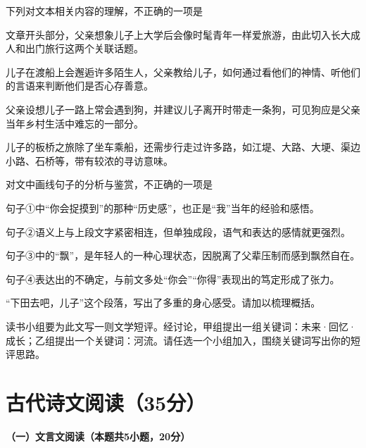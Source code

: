 \documentclass{exam-zh}
\begin{document}
\begin{question}[points=3]
    下列对文本相关内容的理解，不正确的一项是\paren
    \begin{choices}
        \item 文章开头部分，父亲想象儿子上大学后会像时髦青年一样爱旅游，由此切入长大成人和出门旅行这两个关联话题。
        \item 儿子在渡船上会邂逅许多陌生人，父亲教给儿子，如何通过看他们的神情、听他们的言语来判断他们是否心存善意。
        \item 父亲设想儿子一路上常会遇到狗，并建议儿子离开时带走一条狗，可见狗应是父亲当年乡村生活中难忘的一部分。
        \item 儿子的板桥之旅除了坐车乘船，还需步行走过许多路，如江堤、大路、大埂、渠边小路、石桥等，带有较浓的寻访意味。
    \end{choices}
\end{question}

\begin{question}[points=3]
    对文中画线句子的分析与鉴赏，不正确的一项是\paren
    \begin{choices}
        \item 句子①中“你会捉摸到”的那种“历史感”，也正是“我”当年的经验和感悟。
        \item 句子②语义上与上段文字紧密相连，但单独成段，语气和表达的感情就更强烈。
        \item 句子③中的“飘”，是年轻人的一种心理状态，因脱离了父辈压制而感到飘然自在。
        \item 句子④表达出的不确定，与前文多处“你会”“你得”表现出的笃定形成了张力。
    \end{choices}
\end{question}

\begin{question}[points=5]
    “下田去吧，儿子”这个段落，写出了多重的身心感受。请加以梳理概括。
\end{question}

\begin{question}[points=5]
    读书小组要为此文写一则文学短评。经讨论，甲组提出一组关键词：未来·回忆·成长；乙组提出一个关键词：河流。请任选一个小组加入，围绕关键词写出你的短评思路。
\end{question}

\section{古代诗文阅读（35分）}

{\bfseries（一）文言文阅读（本题共5小题，20分）}
\end{document}

